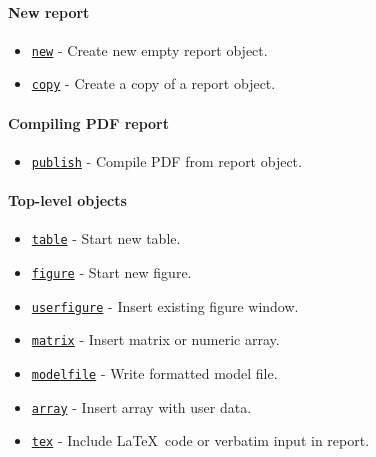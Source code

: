 

	\paragraph{New report}\label{new-report}

\begin{itemize}
\itemsep1pt\parskip0pt
\item
  \href{report/new}{\texttt{new}} - Create new empty report object.
\item
  \href{report/copy}{\texttt{copy}} - Create a copy of a report object.
\end{itemize}

\paragraph{Compiling PDF report}\label{compiling-pdf-report}

\begin{itemize}
\itemsep1pt\parskip0pt
\item
  \href{report/publish}{\texttt{publish}} - Compile PDF from report
  object.
\end{itemize}

\paragraph{Top-level objects}\label{top-level-objects}

\begin{itemize}
\itemsep1pt\parskip0pt
\item
  \href{report/table}{\texttt{table}} - Start new table.
\item
  \href{report/figure}{\texttt{figure}} - Start new figure.
\item
  \href{report/userfigure}{\texttt{userfigure}} - Insert existing figure
  window.
\item
  \href{report/matrix}{\texttt{matrix}} - Insert matrix or numeric
  array.
\item
  \href{report/modelfile}{\texttt{modelfile}} - Write formatted model
  file.
\item
  \href{report/array}{\texttt{array}} - Insert array with user data.
\item
  \href{report/tex}{\texttt{tex}} - Include \LaTeX~code or verbatim
  input in report.
\end{itemize}

